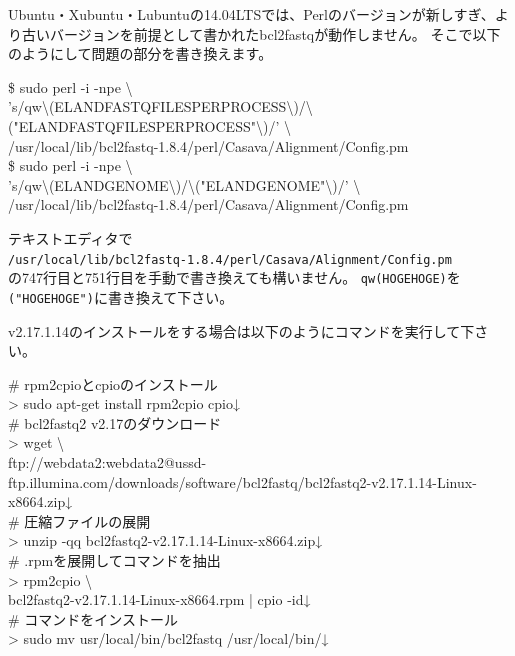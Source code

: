 \documentclass[titlepage,10pt,a4paper]{jsbook}
\newenvironment{cmd}{\begin{oframed}\raggedright\ttfamily\footnotesize\setlength{\baselineskip}{1.4em}}{\end{oframed}\vspace{-1em}}
\begin{document}
Ubuntu・Xubuntu・Lubuntuの14.04LTSでは、Perlのバージョンが新しすぎ、より古いバージョンを前提として書かれたbcl2fastqが動作しません。
そこで以下のようにして問題の部分を書き換えます。
\begin{cmd}
\$ sudo perl -i -npe {\textbackslash}\\
's/qw{\textbackslash}(ELAND{\textunderscore}FASTQ{\textunderscore}FILES{\textunderscore}PER{\textunderscore}PROCESS{\textbackslash})/{\textbackslash}("ELAND{\textunderscore}FASTQ{\textunderscore}FILES{\textunderscore}PER{\textunderscore}PROCESS"{\textbackslash})/' {\textbackslash}\\
/usr/local/lib/bcl2fastq-1.8.4/perl/Casava/Alignment/Config.pm\\
\$ sudo perl -i -npe {\textbackslash}\\
's/qw{\textbackslash}(ELAND{\textunderscore}GENOME{\textbackslash})/{\textbackslash}("ELAND{\textunderscore}GENOME"{\textbackslash})/' {\textbackslash}\\
/usr/local/lib/bcl2fastq-1.8.4/perl/Casava/Alignment/Config.pm
\end{cmd}
テキストエディタで\\
\texttt{/usr/local/lib/bcl2fastq-1.8.4/perl/Casava/Alignment/Config.pm}\\
の747行目と751行目を手動で書き換えても構いません。
\texttt{qw(HOGEHOGE)}を\texttt{("HOGEHOGE")}に書き換えて下さい。

v2.17.1.14のインストールをする場合は以下のようにコマンドを実行して下さい。
\begin{cmd}
\# rpm2cpioとcpioのインストール\\
{\textgreater} sudo apt-get install rpm2cpio cpio↓\\
\# bcl2fastq2 v2.17のダウンロード\\
{\textgreater} wget {\textbackslash}\\
ftp://webdata2:webdata2@ussd-ftp.illumina.com/downloads/software/bcl2fastq/bcl2fastq2-v2.17.1.14-Linux-x86{\textunderscore}64.zip↓\\
\# 圧縮ファイルの展開\\
{\textgreater} unzip -qq bcl2fastq2-v2.17.1.14-Linux-x86{\textunderscore}64.zip↓\\
\# .rpmを展開してコマンドを抽出\\
{\textgreater} rpm2cpio {\textbackslash}\\
bcl2fastq2-v2.17.1.14-Linux-x86{\textunderscore}64.rpm | cpio -id↓\\
\# コマンドをインストール\\
{\textgreater} sudo mv usr/local/bin/bcl2fastq /usr/local/bin/↓
\end{cmd}
\end{document}

